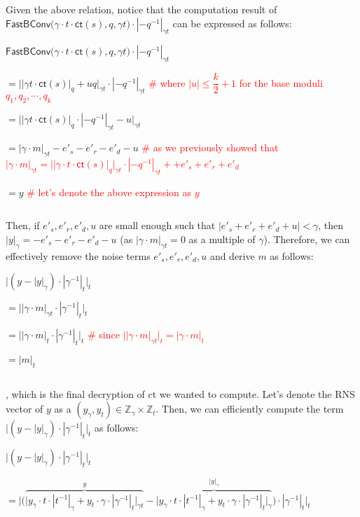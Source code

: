 $ $

Given the above relation, notice that the computation result of $\textsf{FastBConv}\bm(\gamma\cdot t\cdot \textsf{ct}(s), q, \gamma t\bm) \cdot |-q^{-1}|_{\gamma t}$ can be expressed as follows: 

$\textsf{FastBConv}\bm(\gamma\cdot t\cdot \textsf{ct}(s), q, \gamma t\bm) \cdot |-q^{-1}|_{\gamma t}$

$ = \Big||\gamma t \cdot \textsf{ct}(s)|_q + uq\Big|_{\gamma t} \cdot |-q^{-1}|_{\gamma t} $ \textcolor{red}{\# where $|u| \leq \dfrac{k}{2}+1$ for the base moduli $q_1, q_2, \cdots, q_k$}

$ =  \Big||\gamma t \cdot \textsf{ct}(s)|_q \cdot |-q^{-1}|_{\gamma t}  - u\Big|_{\gamma t}$

$= |\gamma \cdot m|_{\gamma t}  - e'_s - e'_r - e'_d - u$ \textcolor{red}{ \# as we previously showed that $|\gamma \cdot m|_{\gamma t} = \Big||\gamma\cdot t\cdot \textsf{ct}(s)|_q\Big|_{\gamma t} \cdot |-q^{-1}|_{\gamma t} +  + e'_s + e'_r + e'_d$}

$= y$ \textcolor{red}{ \# let's denote the above expression as $y$}

$ $

Then, if $e'_s, e'_r, e'_d, u$ are small enough such that $|e'_s + e'_r + e'_d + u| < \gamma$, then $|y|_{\gamma} = -e'_s -e'_r - e'_d - u$ (as $|\gamma \cdot m|_{\gamma t} = 0$ as a multiple of $\gamma$). Therefore, we can effectively remove the noise terms $e'_s, e'_r, e'_d, u$ and derive $m$ as follows:

$\bm{\Big|}(y - |y|_{\gamma}) \cdot |\gamma^{-1}|_t\bm{\Big|}_t$

$ = \bm{\Big|}|\gamma\cdot m|_{\gamma t} \cdot |\gamma^{-1}|_t\bm{\Big|}_t$

$ = \bm{\Big|}|\gamma\cdot m|_{t} \cdot |\gamma^{-1}|_t\bm{\Big|}_t$ \textcolor{red}{ \# since $\Big||\gamma\cdot m|_{\gamma t}\Big|_t = |\gamma\cdot m|_{t}$}

$= |m|_t$

$ $

, which is the final decryption of \textsf{ct} we wanted to compute. Let's denote the RNS vector of $y$ as a $(y_{\gamma}, y_{t}) \in \mathbb{Z}_{\gamma} \times \mathbb{Z}_{t}$. Then, we can efficiently compute the term $\Big|(y - |y|_{\gamma}) \cdot |\gamma^{-1}|_t\Big|_t$ as follows:

$\Big|(y - |y|_{\gamma}) \cdot |\gamma^{-1}|_t\Big|_t$

$= \Bigg|\Big( \overbrace{\Big|y_{\gamma}\cdot t \cdot |t^{-1}|_{\gamma} + y_{t}\cdot \gamma \cdot |\gamma^{-1}|_{t} \Big|_{\gamma t}}^{y} - \overbrace{\Big|y_{\gamma}\cdot t \cdot |t^{-1}|_{\gamma} + y_{t}\cdot \gamma \cdot |\gamma^{-1}|_{t}\Big|_{\gamma}}^{|y|_{\gamma}}\Big) \cdot |\gamma^{-1}|_t\Bigg|_t$

